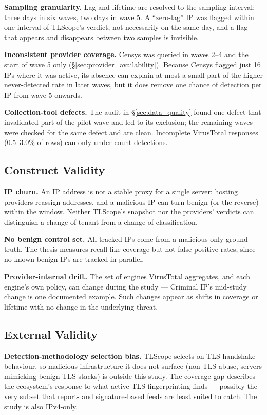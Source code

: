 \textbf{Sampling granularity.} Lag and lifetime are resolved to the sampling interval: three days in
six waves, two days in wave 5. A ``zero-lag'' IP was flagged within one interval of TLScope's
verdict, not necessarily on the same day, and a flag that appears and disappears between two samples
is invisible.

\textbf{Inconsistent provider coverage.} Censys was queried in waves 2--4 and the start of wave 5
only (\S\ref{sec:provider_availability}). Because Censys flagged just 16 IPs where it was active, its
absence can explain at most a small part of the higher never-detected rate in later waves, but it
does remove one chance of detection per IP from wave 5 onwards.

\textbf{Collection-tool defects.} The audit in \S\ref{sec:data_quality} found one defect that
invalidated part of the pilot wave and led to its exclusion; the remaining waves were checked for
the same defect and are clean. Incomplete VirusTotal responses (0.5--3.0\% of rows) can only
under-count detections.

\subsection{Construct Validity}

\textbf{IP churn.} An IP address is not a stable proxy for a single server: hosting providers reassign
addresses, and a malicious IP can turn benign (or the reverse) within the window. Neither TLScope's
snapshot nor the providers' verdicts can distinguish a change of tenant from a change of
classification.

\textbf{No benign control set.} All tracked IPs come from a malicious-only ground truth. The thesis
measures recall-like coverage but not false-positive rates, since no known-benign IPs are tracked in
parallel.

\textbf{Provider-internal drift.} The set of engines VirusTotal aggregates, and each engine's own
policy, can change during the study --- Criminal IP's mid-study change is one documented example. Such
changes appear as shifts in coverage or lifetime with no change in the underlying threat.

\subsection{External Validity}

\textbf{Detection-methodology selection bias.} TLScope selects on TLS handshake behaviour, so
malicious infrastructure it does not surface (non-TLS abuse, servers mimicking benign TLS stacks) is
outside this study. The coverage gap describes the ecosystem's response to what active TLS
fingerprinting finds --- possibly the very subset that report- and signature-based feeds are least
suited to catch. The study is also IPv4-only.

